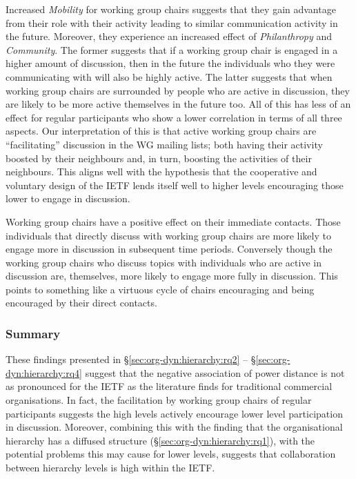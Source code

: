 \documentclass[twocolumn,10pt]{article}
\newcommand{\pb}[1]{\vspace{0.75ex}\noindent{\textbf{#1}}}
\begin{document}
\pb{Summary:}
Increased \textit{Mobility} for working group chairs suggests that they
gain advantage from their role with their activity leading to similar
communication activity in the future. Moreover, they experience an
increased effect of \textit{Philanthropy} and \textit{Community}. The
former suggests that if a working group chair is engaged in a higher amount
of discussion, then in the future the individuals who they were
communicating with will also be highly active.  The latter suggests that
when working group chairs are surrounded by people who are active in
discussion, they are likely to be more active themselves in the future too.
All of this has less of an effect for regular participants who show a lower
correlation in terms of all three aspects. Our interpretation of this is
that active working group chairs are ``facilitating'' discussion in the WG
mailing lists; both having their activity boosted by their neighbours and,
in turn, boosting the activities of their neighbours. This aligns well with
the hypothesis that the cooperative and voluntary design of the IETF lends
itself well to higher levels encouraging those lower to engage in
discussion. 

Working group chairs have a positive effect on their immediate contacts.
Those individuals that directly discuss with working group chairs are more
likely to engage more in discussion in subsequent time periods.  Conversely
though the working group chairs who discuss topics with individuals who are
active in discussion are, themselves, more likely to engage more fully in
discussion. This points to something like a virtuous cycle of chairs
encouraging and being encouraged by their direct contacts. 

\subsubsection{Summary}


These findings presented in \S\ref{sec:org-dyn:hierarchy:rq2} --
\S\ref{sec:org-dyn:hierarchy:rq4} suggest that the negative association of
power distance is not as pronounced for the IETF as the literature finds
for traditional commercial organisations. In fact, the facilitation by
working group chairs of regular participants suggests the high levels
actively encourage lower level participation in discussion. 
Moreover, combining this with the finding that the organisational hierarchy
has a diffused structure (\S\ref{sec:org-dyn:hierarchy:rq1}), with the
potential problems this may cause for lower levels, suggests that
collaboration between hierarchy levels is high within the IETF.
\end{document}
